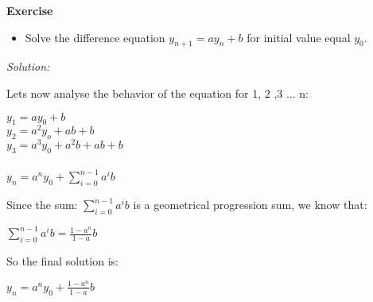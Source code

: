 \documentclass[paper=9in:6in,pagesize=pdftex,headinclude=on,footinclude=on,10pt,bibtotoc,pointlessnumbers,normalheadings,DIV=9,twoside=false]{scrbook}
\begin{document}
\date{}


\begin{large} 
 \textbf{Exercise}
\end{large} 
\begin{itemize} 
\item Solve the difference equation $y_{n+1} =a y_n + b$ for  initial value equal $y_0$. \\
\end{itemize}

\begin{large}
\textit{Solution:\\}
\end{large}

 
\begin{text}
Lets now analyse the behavior of the equation for 1, 2 ,3 ... n:
\end{text}

\begin{center}
$y_1 = ay_0 +b$ \\
$y_2 = a^2y_o +ab +b$ \\
$y_3 = a^3y_0 + a^2b + ab + b$ \\
\ \\
$y_n = a^n y_0 + \sum\limits_{i=0}^{n-1}a^ib $
\end{center}

\begin{text}
Since the sum:  $\sum\limits_{i=0}^{n-1}a^ib $ is a geometrical progression sum, we know that: \\ 
\end{text}

\begin{center}
$\sum\limits_{i=0}^{n-1}a^ib = \frac{1-a^n}{1-a} b$ \\
\end{center}



\begin{text}
So the final solution is: 
\end{text}

\begin{center}
$y_n = a^ny_0 + \frac{1-a^n}{1-a} b$
\end{center}
\end{document}
